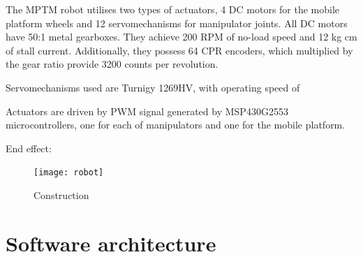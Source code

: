 The MPTM robot utilises two types of actuators, 4 DC motors for the mobile platform wheels and 12 servomechanisms for manipulator joints. 
All DC motors have 50:1 metal gearboxes. They achieve 200 RPM of no-load speed and 12 kg cm of stall current. Additionally, they possess 64 CPR encoders, which multiplied by the gear ratio provide 3200 counts per revolution.

Servomechanisms used are Turnigy 1269HV, with operating speed of 

Actuators are driven by PWM signal generated by MSP430G2553 microcontrollers, one for each of manipulators and one for the mobile platform.

End effect:
\begin{figure}[H]
\centering
\texttt{[image: robot]}
\caption{Construction}
\end{figure}

\section{Software architecture}
\label{sec:soft}

